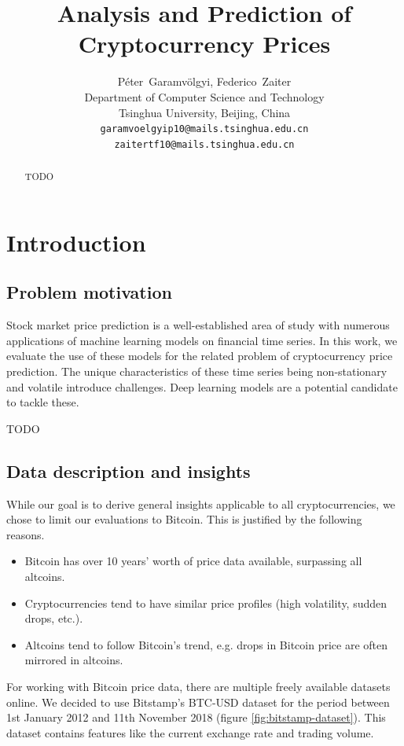 \documentclass{article}
\title{Analysis and Prediction of Cryptocurrency Prices}
\author{%
  Péter~Garamvölgyi, Federico~Zaiter\\
  Department of Computer Science and Technology\\
  Tsinghua University, Beijing, China\\
  \texttt{garamvoelgyip10@mails.tsinghua.edu.cn} \\
  \texttt{zaitertf10@mails.tsinghua.edu.cn}
}
\begin{document}

\maketitle

\begin{abstract}
TODO
\end{abstract}


\section{Introduction}

\subsection{Problem motivation}

Stock market price prediction is a well-established area of study with numerous applications of machine learning models on financial time series. In this work, we evaluate the use of these models for the related problem of cryptocurrency price prediction. The unique characteristics of these time series being non-stationary and volatile introduce challenges. Deep learning models are a potential candidate to tackle these.

TODO

\subsection{Data description and insights}

While our goal is to derive general insights applicable to all cryptocurrencies, we chose to limit our evaluations to Bitcoin. This is justified by the following reasons.

\begin{itemize}
	\item Bitcoin has over 10 years' worth of price data available, surpassing all altcoins.
	\item Cryptocurrencies tend to have similar price profiles (high volatility, sudden drops, etc.).
	\item Altcoins tend to follow Bitcoin's trend, e.g. drops in Bitcoin price are often mirrored in altcoins.
\end{itemize}

For working with Bitcoin price data, there are multiple freely available datasets online. We decided to use Bitstamp's BTC-USD dataset for the period between 1st January 2012 and 11th November 2018 (figure \ref{fig:bitstamp-dataset}). This dataset contains features like the current exchange rate and trading volume. 
\end{document}
